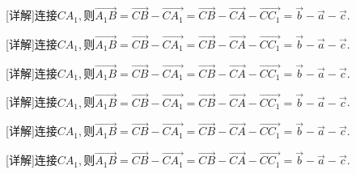 \documentclass[fontset=none]{ctexart}
\begin{document}
\noindent\begin{minipage}[t]{48.600mm}\raggedright [详解]连接\(CA_{1},\)则\nobreak\(\overrightarrow{A_{1}B} = \overrightarrow{CB} - \overrightarrow{CA_{1}} = \overrightarrow{CB} - \overrightarrow{CA} - \overrightarrow{CC_{1}} =\overrightarrow{b} - \overrightarrow{a} - \overrightarrow{c}\).\end{minipage}\par\newpage
\noindent\begin{minipage}[t]{48.800mm}\raggedright [详解]连接\(CA_{1},\)则\nobreak\(\overrightarrow{A_{1}B} = \overrightarrow{CB} - \overrightarrow{CA_{1}} = \overrightarrow{CB} - \overrightarrow{CA} - \overrightarrow{CC_{1}} =\overrightarrow{b} - \overrightarrow{a} - \overrightarrow{c}\).\end{minipage}\par\newpage
\noindent\begin{minipage}[t]{49.000mm}\raggedright [详解]连接\(CA_{1},\)则\nobreak\(\overrightarrow{A_{1}B} = \overrightarrow{CB} - \overrightarrow{CA_{1}} = \overrightarrow{CB} - \overrightarrow{CA} - \overrightarrow{CC_{1}} =\overrightarrow{b} - \overrightarrow{a} - \overrightarrow{c}\).\end{minipage}\par\newpage
\noindent\begin{minipage}[t]{49.100mm}\raggedright [详解]连接\(CA_{1},\)则\nobreak\(\overrightarrow{A_{1}B} = \overrightarrow{CB} - \overrightarrow{CA_{1}} = \overrightarrow{CB} - \overrightarrow{CA} - \overrightarrow{CC_{1}} =\overrightarrow{b} - \overrightarrow{a} - \overrightarrow{c}\).\end{minipage}\par\newpage
\noindent\begin{minipage}[t]{49.200mm}\raggedright [详解]连接\(CA_{1},\)则\nobreak\(\overrightarrow{A_{1}B} = \overrightarrow{CB} - \overrightarrow{CA_{1}} = \overrightarrow{CB} - \overrightarrow{CA} - \overrightarrow{CC_{1}} =\overrightarrow{b} - \overrightarrow{a} - \overrightarrow{c}\).\end{minipage}\par\newpage
\noindent\begin{minipage}[t]{49.300mm}\raggedright [详解]连接\(CA_{1},\)则\nobreak\(\overrightarrow{A_{1}B} = \overrightarrow{CB} - \overrightarrow{CA_{1}} = \overrightarrow{CB} - \overrightarrow{CA} - \overrightarrow{CC_{1}} =\overrightarrow{b} - \overrightarrow{a} - \overrightarrow{c}\).\end{minipage}\par\newpage
\end{document}

